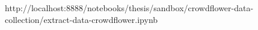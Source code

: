 %
%
http://localhost:8888/notebooks/thesis/sandbox/crowdflower-data-collection/extract-data-crowdflower.ipynb
%
%
%
%
%
%
%
%
%
%
%

